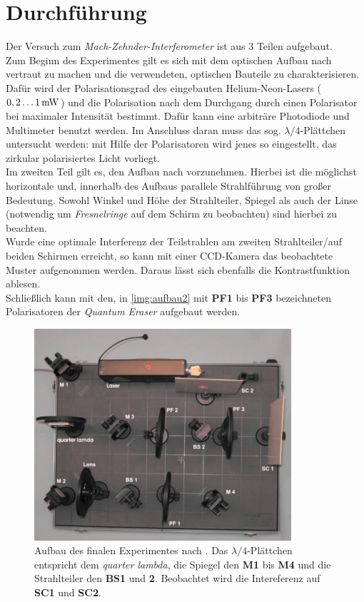 \documentclass[numbers=noenddot,a4paper,notitlepage,twoside,BCOR15mm]{scrartcl}
\newcommand{\tilt}[1]{\textit{#1}}
\newcommand{\fett}[1]{\textbf{#1}}
\begin{document}
	\clearpage
	\section{Durchführung}

		Der Versuch zum \tilt{Mach-Zehnder-Interferometer} ist aus 3 Teilen aufgebaut.\\
		Zum Beginn des Experimentes gilt es sich mit dem optischen Aufbau nach \cite{MZaufbau} vertraut zu machen und die verwendeten, optischen Bauteile zu charakterisieren. Dafür wird der Polarisationsgrad des eingebauten Helium-Neon-Lasers ($\unit[0,2\dots1]{mW}$) und die Polarisation nach dem Durchgang durch einen Polarisator bei maximaler Intensität bestimmt. Dafür kann eine arbiträre Photodiode und Multimeter benutzt werden. Im Anschluss daran muss das sog. $\lambda/4$-Plättchen untersucht werden: mit Hilfe der Polarisatoren wird jenes so eingestellt, das zirkular polarisiertes Licht vorliegt.\\
		Im zweiten Teil gilt es, den Aufbau nach \cite{MZaufbau} vorzunehmen. Hierbei ist die möglichst horizontale und, innerhalb des Aufbaus parallele Strahlführung von großer Bedeutung. Sowohl Winkel und Höhe der Strahlteiler, Spiegel als auch der Linse (notwendig um \tilt{Fresnelringe} auf dem Schirm zu beobachten) sind hierbei zu beachten.\\
		Wurde eine optimale Interferenz der Teilstrahlen am zweiten Strahlteiler/auf beiden Schirmen erreicht, so kann mit einer CCD-Kamera das beobachtete Muster aufgenommen werden. Daraus lässt sich ebenfalls die Kontrastfunktion ablesen.\\
		Schließlich kann mit den, in \autoref{img:aufbau2} mit \fett{PF1} bis \fett{PF3} bezeichneten Polarisatoren der \tilt{Quantum Eraser} aufgebaut werden.

			\begin{figure}[H]
				\centering
				\includegraphics[width=0.85\textwidth]{aufbau.png}
				\caption{Aufbau des finalen Experimentes nach \cite{MZaufbau}. Das $\lambda/4$-Plättchen entspricht dem \tilt{quarter lambda}, die Spiegel den \fett{M1} bis \fett{M4} und die Strahlteiler den \fett{BS1} und \fett{2}. Beobachtet wird die Intereferenz auf \fett{SC1} und \fett{SC2}.}
				\label{img:aufbau2}
			\end{figure}
\end{document}
